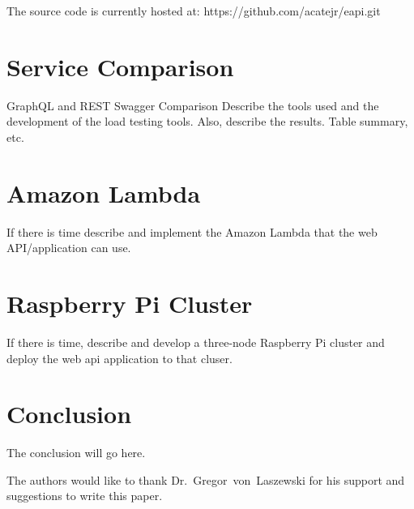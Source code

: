 The source code is currently hosted at: https://github.com/acatejr/eapi.git

\section{Service Comparison}
GraphQL and REST Swagger Comparison
Describe the tools used and the development of the load testing tools.  
Also, describe the results.  Table summary, etc.

\section{Amazon Lambda}
If there is time describe and implement the Amazon Lambda that the web 
API/application can use.

\section{Raspberry Pi Cluster}
If there is time, describe and develop a three-node Raspberry Pi cluster and 
deploy the web api application to that cluser.

\section{Conclusion}
The conclusion will go here.

\begin{acks}
The authors would like to thank Dr.~Gregor~von~Laszewski for his support 
and suggestions to write this paper.
\end{acks}


 
